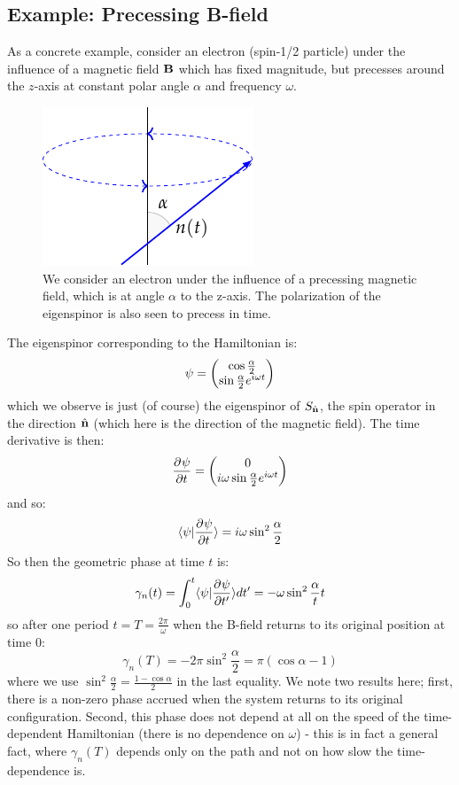 \subsection{Example: Precessing B-field}
As a concrete example, consider an electron (spin-1/2 particle) under the influence of a magnetic field $\mathbf{B}$ which has fixed magnitude, but precesses around the $z$-axis at constant polar angle $\alpha$ and frequency $\omega$. 

\begin{figure}[htbp]
    \centering
    \includegraphics[]{Images/fig-spinprecessberry.pdf}
    \caption{We consider an electron under the influence of a precessing magnetic field, which is at angle $\alpha$ to the z-axis. The polarization of the eigenspinor is also seen to precess in time.}
    \label{fig-spinprecessberry}
\end{figure}
The eigenspinor corresponding to the Hamiltonian is:
\begin{equation}
    \psi = \begin{pmatrix}\cos\frac{\alpha}{2} \\ \sin\frac{\alpha}{2}e^{i\omega t}\end{pmatrix}
\end{equation}
which we observe is just (of course) the eigenspinor of $S_{\hat{\mathbf{n}}}$, the spin operator in the direction $\hat{\mathbf{n}}$ (which here is the direction of the magnetic field). The time derivative is then:
\begin{equation}
    \dpd{\psi}{t} = \m{0\\ i \omega \sin \frac{\alpha}{2}e^{i\omega t}}
\end{equation}
and so:
\begin{equation}
    \braket{\psi}{\dpd{\psi}{t}} = i\omega \sin^2\frac{\alpha}{2}
\end{equation}
So then the geometric phase at time $t$ is:
\begin{equation}
    \gamma_n(t) = \int_0^t \braket{\psi}{\dpd{\psi}{t'}}dt' = -\omega \sin^2\frac{\alpha}{t}t
\end{equation}
so after one period $t = T = \frac{2\pi}{\omega}$ when the B-field returns to its original position at time $0$:
\begin{equation}
    \gamma_n(T) = -2\pi\sin^2\frac{\alpha}{2} = \pi(\cos\alpha - 1)
\end{equation}
where we use $\sin^2\frac{\alpha}{2} = \frac{1 -\cos\alpha}{2}$ in the last equality. We note two results here; first, there is a non-zero phase accrued when the system returns to its original configuration. Second, this phase does not depend at all on the speed of the time-dependent Hamiltonian (there is no dependence on $\omega$) - this is in fact a general fact, where $\gamma_n(T)$ depends only on the path and not on how slow the time-dependence is.

